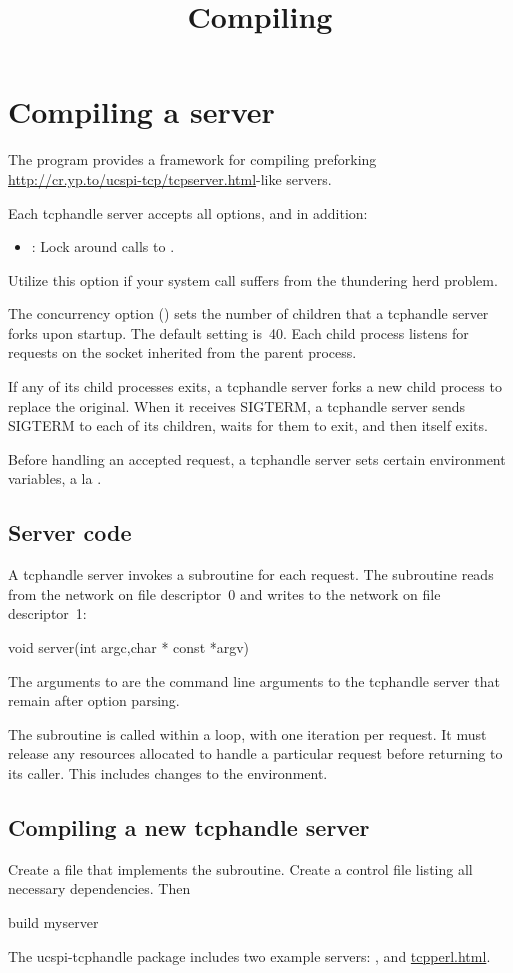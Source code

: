 \documentclass{book}
\title{Compiling}
\begin{document}
\section{Compiling a  server}

The  program provides a framework for compiling
preforking
\href{\cmd{tcpserver}}{http://cr.yp.to/ucspi-tcp/tcpserver.html}-like
servers.

Each tcphandle server accepts all  options, and in
addition:
\begin{itemize}
  \item {}:
    Lock  around calls to .
\end{itemize}
Utilize this option if your  system call suffers from the
thundering herd problem.

The concurrency option () sets the number of children that a
tcphandle server forks upon startup.  The default setting is~40.  Each
child process listens for requests on the socket inherited from the
parent process.

If any of its child processes exits, a tcphandle server forks a new
child process to replace the original.  When it receives SIGTERM, a
tcphandle server sends SIGTERM to each of its children, waits for them
to exit, and then itself exits.

Before handling an accepted request, a tcphandle server sets certain
environment variables, a la .

\subsection{Server code}
A tcphandle server invokes a  subroutine for each request.
The subroutine reads from the network on file descriptor~0 and writes to
the network on file descriptor~1:
\begin{code}%
  void server(int argc,char * const *argv)
\end{code}
The arguments to  are the command line arguments to the
tcphandle server that remain after option parsing.

The  subroutine is called within a loop, with one iteration
per request.  It must release any resources allocated to handle a
particular request before returning to its caller.  This includes
changes to the environment.

\subsection{Compiling a new tcphandle server}
Create a file  that implements the 
subroutine.  Create a control file  listing all
necessary dependencies.  Then
\begin{code}%
  build myserver
\end{code}

The ucspi-tcphandle package includes two example servers:
, and \href{\cmd{tcpperl}}{tcpperl.html}.
\end{document}
